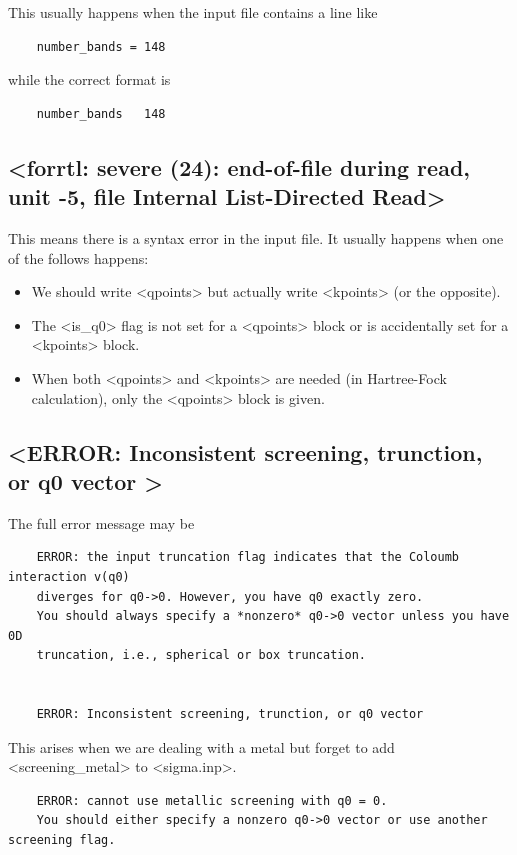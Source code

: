 \documentclass[hyperref, a4paper, 12pt]{report}
\def\texttt#1{<#1>}%
\newcommand{\shortcode}[1]{\texttt{#1}}
\begin{document}
This usually happens when the input file contains a line like 
\begin{lstlisting}
    number_bands = 148 
\end{lstlisting}
while the correct format is 
\begin{lstlisting}
    number_bands   148 
\end{lstlisting}

\subsection{\shortcode{forrtl: severe (24): end-of-file during read, unit -5, file Internal List-Directed Read}}

This means there is a syntax error in the input file.
It usually happens when one of the follows happens:
\begin{itemize}
    \item We should write \shortcode{qpoints} but actually write \shortcode{kpoints}
    (or the opposite).
    \item The \shortcode{is_q0} flag is not set for a \shortcode{qpoints} block
    or is accidentally set for a \shortcode{kpoints} block.
    \item When both \shortcode{qpoints} and \shortcode{kpoints} are needed
    (in Hartree-Fock calculation), 
    only the \shortcode{qpoints} block is given.
\end{itemize}

\subsection{\shortcode{ERROR: Inconsistent screening, trunction, or q0 vector  }}

The full error message may be 
\begin{lstlisting}
    ERROR: the input truncation flag indicates that the Coloumb interaction v(q0)
    diverges for q0->0. However, you have q0 exactly zero.
    You should always specify a *nonzero* q0->0 vector unless you have 0D 
    truncation, i.e., spherical or box truncation.

    
    ERROR: Inconsistent screening, trunction, or q0 vector    
\end{lstlisting}
This arises when we are dealing with a metal 
but forget to add \shortcode{screening_metal} to \shortcode{sigma.inp}.

\begin{lstlisting}
    ERROR: cannot use metallic screening with q0 = 0.
    You should either specify a nonzero q0->0 vector or use another screening flag.
\end{lstlisting}
\end{document}
